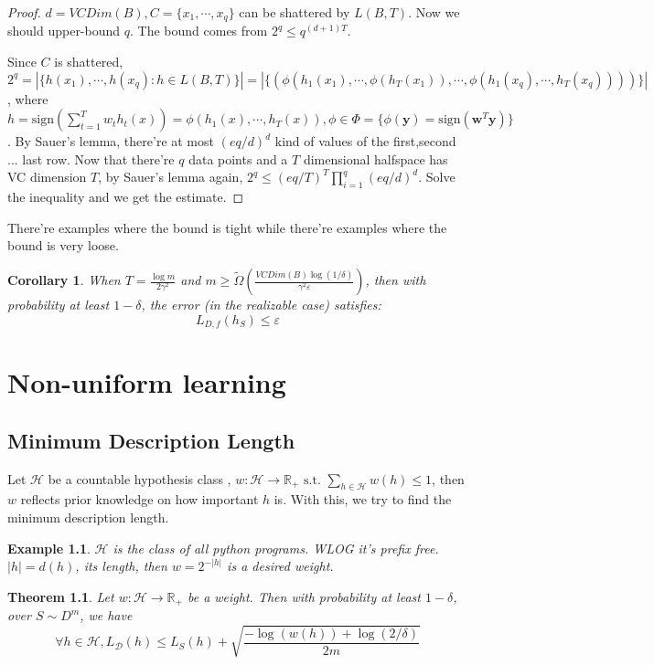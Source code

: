 \documentclass{book}
\newcommand{\R}{\mathbb{R}}
\newcommand{\st}{\text{ s.t. }}
\renewcommand{\H}{\mathcal{H}}
\newcommand{\D}{\mathcal{D}}
\newtheorem{Thm}{Theorem}[section]
\newtheorem{Cor}[Thm]{Corollary}
\newtheorem{Eg}{Example}[section]
\begin{document}
\begin{proof}
  $d=VCDim(B), C=\{x_{1},\cdots,x_{q}\}$ can be shattered by $L(B,T)$. Now we should upper-bound $q$. The bound comes from $2^{q}\leq q^{(d+1)T}$.

  Since $C$ is shattered, $2^{q}=|\{h(x_{1}),\cdots,h(x_{q}):h\in L(B,T)\}|=|\{(\phi(h_{1}(x_{1}),\cdots,\phi(h_{T}(x_{1})),\cdots,\phi(h_{1}(x_{q}),\cdots,h_{T}(x_{q}))))\}|$, where $h=\mathrm{sign}(\sum_{t=1}^{T}w_{t}h_{t}(x))=\phi(h_{1}(x),\cdots, h_{T}(x)),\phi\in\Phi=\{\phi(\bm{y})=\mathrm{sign}(\bm{w}^{T}\bm{y})\}$. By Sauer's lemma, there're at most $(eq/d)^{d}$ kind of values of the first,second ... last row. Now that there're $q$ data points and a $T$ dimensional halfspace has VC dimension $T$, by Sauer's lemma again, $2^{q}\leq(eq/T)^{T}\prod_{i=1}^{q}(eq/d)^{d}$. Solve the inequality and we get the estimate.
\end{proof}

There're examples where the bound is tight while there're examples where the bound is very loose.

\begin{Cor}
  When $T=\frac{\log m}{2\gamma^{2}}$  and $m\geq \tilde{\Omega}(\frac{VCDim(B)\log(1/\delta)}{\gamma^{2}\varepsilon})$, then with probability at least $1-\delta$, the error (in the realizable case) satisfies:
  \[L_{D,f}(h_{S})\leq \varepsilon\]
\end{Cor}


\chapter{Non-uniform learning}

\section{Minimum Description Length}
Let $\H$ be a countable hypothesis class , $w:\H\rightarrow \R_+\st \sum_{h\in \H}w(h)\leq 1$, then $w$ reflects prior knowledge on how important $h$ is. With this, we try to find the minimum description length.

\begin{Eg}
  $\H$ is the class of all python programs. WLOG it's prefix free. $|h|=d(h)$, its length, then $w=2^{-|h|}$ is a desired weight.
\end{Eg}

\begin{Thm}
  Let $w:\H\to\R_+$ be a weight. Then with probability at least $1-\delta$, over $S\sim D^{m}$, we have
  \[\forall h\in \H, L_{\D}(h)\leq L_{S}(h)+\sqrt{\frac{-\log(w(h))+\log(2/\delta)}{2m}}\]
\end{Thm}
\end{document}
